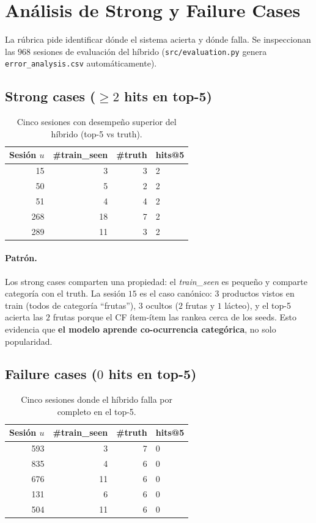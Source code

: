 \documentclass[12pt,a4paper]{article}
\newcommand{\code}[1]{\texttt{\small #1}}
\begin{document}
\section{Análisis de Strong y Failure Cases}

La rúbrica pide identificar dónde el sistema acierta y dónde falla. Se inspeccionan las $968$ sesiones de evaluación del híbrido (\code{src/evaluation.py} genera \code{error\_analysis.csv} automáticamente).

\subsection{Strong cases ($\geq 2$ hits en top-5)}

\begin{table}[H]
\centering
\caption{Cinco sesiones con desempeño superior del híbrido (top-5 vs truth).}
\label{tab:strong}
\begin{tabular}{rrrl}
\toprule
Sesión $u$ & \#train\_seen & \#truth & hits@5 \\
\midrule
15  & 3  & 3 & 2 \\
50  & 5  & 2 & 2 \\
51  & 4  & 4 & 2 \\
268 & 18 & 7 & 2 \\
289 & 11 & 3 & 2 \\
\bottomrule
\end{tabular}
\end{table}

\paragraph{Patrón.} Los strong cases comparten una propiedad: el \emph{train\_seen} es pequeño y comparte categoría con el truth. La sesión $15$ es el caso canónico: 3 productos vistos en train (todos de categoría ``frutas''), $3$ ocultos ($2$ frutas y $1$ lácteo), y el top-5 acierta las $2$ frutas porque el CF ítem-ítem las rankea cerca de los seeds. Esto evidencia que \textbf{el modelo aprende co-ocurrencia categórica}, no solo popularidad.

\subsection{Failure cases ($0$ hits en top-5)}

\begin{table}[H]
\centering
\caption{Cinco sesiones donde el híbrido falla por completo en el top-5.}
\label{tab:fail}
\begin{tabular}{rrrl}
\toprule
Sesión $u$ & \#train\_seen & \#truth & hits@5 \\
\midrule
593 & 3 & 7 & 0 \\
835 & 4 & 6 & 0 \\
676 & 11 & 6 & 0 \\
131 & 6 & 6 & 0 \\
504 & 11 & 6 & 0 \\
\bottomrule
\end{tabular}
\end{table}
\end{document}
